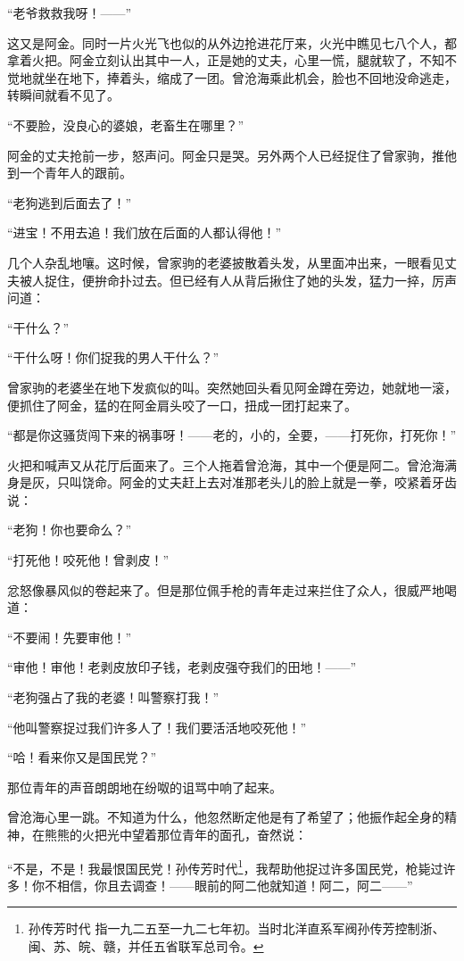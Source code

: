\par “老爷救救我呀！——”
\par 这又是阿金。同时一片火光飞也似的从外边抢进花厅来，火光中瞧见七八个人，都拿着火把。阿金立刻认出其中一人，正是她的丈夫，心里一慌，腿就软了，不知不觉地就坐在地下，捧着头，缩成了一团。曾沧海乘此机会，脸也不回地没命逃走，转瞬间就看不见了。
\par “不要脸，没良心的婆娘，老畜生在哪里？”
\par 阿金的丈夫抢前一步，怒声问。阿金只是哭。另外两个人已经捉住了曾家驹，推他到一个青年人的跟前。
\par “老狗逃到后面去了！”
\par “进宝！不用去追！我们放在后面的人都认得他！”
\par 几个人杂乱地嚷。这时候，曾家驹的老婆披散着头发，从里面冲出来，一眼看见丈夫被人捉住，便拚命扑过去。但已经有人从背后揪住了她的头发，猛力一捽，厉声问道：
\par “干什么？”
\par “干什么呀！你们捉我的男人干什么？”
\par 曾家驹的老婆坐在地下发疯似的叫。突然她回头看见阿金蹲在旁边，她就地一滚，便抓住了阿金，猛的在阿金肩头咬了一口，扭成一团打起来了。
\par “都是你这骚货闯下来的祸事呀！——老的，小的，全要，——打死你，打死你！”
\par 火把和喊声又从花厅后面来了。三个人拖着曾沧海，其中一个便是阿二。曾沧海满身是灰，只叫饶命。阿金的丈夫赶上去对准那老头儿的脸上就是一拳，咬紧着牙齿说：
\par “老狗！你也要命么？”
\par “打死他！咬死他！曾剥皮！”
\par 忿怒像暴风似的卷起来了。但是那位佩手枪的青年走过来拦住了众人，很威严地喝道：
\par “不要闹！先要审他！”
\par “审他！审他！老剥皮放印子钱，老剥皮强夺我们的田地！——”
\par “老狗强占了我的老婆！叫警察打我！”
\par “他叫警察捉过我们许多人了！我们要活活地咬死他！”
\par “哈！看来你又是国民党？”
\par 那位青年的声音朗朗地在纷呶的诅骂中响了起来。
\par 曾沧海心里一跳。不知道为什么，他忽然断定他是有了希望了；他振作起全身的精神，在熊熊的火把光中望着那位青年的面孔，奋然说：
\par “不是，不是！我最恨国民党！孙传芳时代\footnote{孙传芳时代 指一九二五至一九二七年初。当时北洋直系军阀孙传芳控制浙、闽、苏、皖、赣，并任五省联军总司令。}，我帮助他捉过许多国民党，枪毙过许多！你不相信，你且去调查！——眼前的阿二他就知道！阿二，阿二——”
